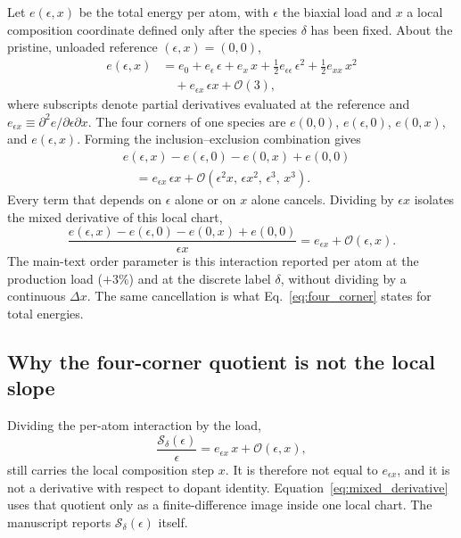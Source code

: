 Let $e(\epsilon,x)$ be the total energy per atom, with $\epsilon$ the biaxial load and $x$ a local composition coordinate defined only after the species $\delta$ has been fixed.
About the pristine, unloaded reference $(\epsilon,x)=(0,0)$,
\begin{equation}
\begin{aligned}
e(\epsilon,x) &= e_0
+ e_\epsilon\,\epsilon
+ e_x\,x
+ \tfrac12 e_{\epsilon\epsilon}\,\epsilon^2
+ \tfrac12 e_{xx}\,x^2 \\
&\quad
+ e_{\epsilon x}\,\epsilon x
+ \mathcal{O}(3),
\end{aligned}
\label{eq:taylor_total}
\end{equation}
where subscripts denote partial derivatives evaluated at the reference and $e_{\epsilon x}\equiv\partial^2 e/\partial\epsilon\partial x$.
The four corners of one species are $e(0,0)$, $e(\epsilon,0)$, $e(0,x)$, and $e(\epsilon,x)$.
Forming the inclusion--exclusion combination gives
\begin{equation}
\begin{aligned}
&e(\epsilon,x)-e(\epsilon,0)-e(0,x)+e(0,0) \\
&\quad=
e_{\epsilon x}\,\epsilon x
+ \mathcal{O}(\epsilon^2 x,\,\epsilon x^2,\,\epsilon^3,\,x^3).
\end{aligned}
\label{eq:cross_combination}
\end{equation}
Every term that depends on $\epsilon$ alone or on $x$ alone cancels.
Dividing by $\epsilon x$ isolates the mixed derivative of this local chart,
\begin{equation}
\frac{e(\epsilon,x)-e(\epsilon,0)-e(0,x)+e(0,0)}{\epsilon x}
= e_{\epsilon x} + \mathcal{O}(\epsilon,x).
\label{eq:cross_result}
\end{equation}
The main-text order parameter is this interaction reported per atom at the production load ($+3\%$) and at the discrete label $\delta$, without dividing by a continuous $\Delta x$.
The same cancellation is what Eq.~\eqref{eq:four_corner} states for total energies.

\subsection{Why the four-corner quotient is not the local slope}
\label{sec:four_corner_deriv}

Dividing the per-atom interaction by the load,
\begin{equation}
\frac{\mathcal{S}_\delta(\epsilon)}{\epsilon}
= e_{\epsilon x}\,x + \mathcal{O}(\epsilon,x),
\label{eq:why_four_fd}
\end{equation}
still carries the local composition step $x$.
It is therefore not equal to $e_{\epsilon x}$, and it is not a derivative with respect to dopant identity.
Equation~\eqref{eq:mixed_derivative} uses that quotient only as a finite-difference image inside one local chart.
The manuscript reports $\mathcal{S}_\delta(\epsilon)$ itself.

